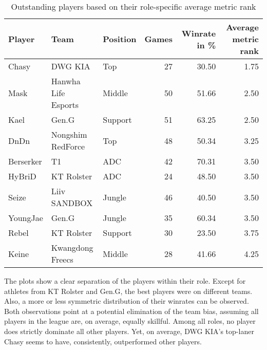 \documentclass{article}
\begin{document}
\begin{table}[h]
\begin{threeparttable}
\caption{Outstanding players based on their role-specific average metric rank}
\begin{tabular}{lllrrr}
\toprule
    Player &                  Team & Position &  Games &  Winrate in \% &  Average metric rank \\
\midrule
     Chasy &              DWG KIA  &      Top &     27 &         30.50 &                 1.75 \\
      Mask &  Hanwha Life Esports  &   Middle &     50 &         51.66 &                 2.50 \\
      Kael &                Gen.G  &  Support &     51 &         63.25 &                 2.50 \\
      DnDn &    Nongshim RedForce  &      Top &     48 &         50.34 &                 3.25 \\
 Berserker &                   T1  &      ADC &     42 &         70.31 &                 3.50 \\
    HyBriD &           KT Rolster  &      ADC &     24 &         48.50 &                 3.50 \\
     Seize &         Liiv SANDBOX  &   Jungle &     46 &         40.50 &                 3.50 \\
  YoungJae &                Gen.G  &   Jungle &     35 &         60.34 &                 3.50 \\
     Rebel &           KT Rolster  &  Support &     30 &         23.50 &                 3.75 \\
     Keine &     Kwangdong Freecs  &   Middle &     28 &         41.66 &                 4.25 \\
\bottomrule
\end{tabular}
\end{threeparttable}

\end{table}
\newpage
The plots show a clear separation of the players within their role. Except for athletes from KT Rolster and Gen.G, the best players were on different teams. Also, a more or less symmetric distribution of their winrates can be observed. Both observations point at a potential elimination of the team bias, assuming all players in the league are, on average, equally skillful. Among all roles, no player does strictly dominate all other players. Yet, on average, DWG KIA's top-laner Chasy seems to have, consistently, outperformed other players. 
\end{document}
